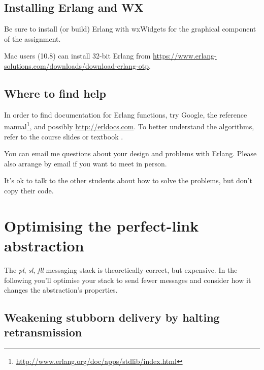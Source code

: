 \documentclass[a4paper]{article}
\begin{document}
\subsection{Installing Erlang and WX} %
\label{sub:installing_erlang_and_wx}

Be sure to install (or build) Erlang with wxWidgets for the graphical
component of the assignment.

Mac users (10.8) can install 32-bit Erlang from
\url{https://www.erlang-solutions.com/downloads/download-erlang-otp}.






\subsection{Where to find help} %
\label{sub:where_to_find_help}

In order to find documentation for Erlang functions, try Google, the reference
manual\footnote{\url{http://www.erlang.org/doc/apps/stdlib/index.html}}, and
possibly \url{http://erldocs.com}.
To better understand the algorithms, refer to the course slides or textbook
\cite{cachin2011}.

You can email me questions about your design and problems with Erlang. Please
also arrange by email if you want to meet in person.

It's ok to talk to the other students about how to solve the problems, but
don't copy their code.









\section{Optimising the perfect-link abstraction} %
\label{sub:optimising_pl}

The \emph{pl}, \emph{sl}, \emph{fll} messaging stack is theoretically correct, but expensive.
In the following you'll optimise your stack to send fewer
messages and consider how it changes the abstraction's properties.

\subsection{Weakening stubborn delivery by halting retransmission} %
\label{ssub:weakening_stubborn_delivery_by_halting_retransmission}
\end{document}
